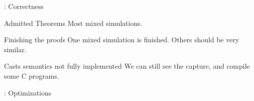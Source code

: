 \begin{frame}{\secname: Correctness}

  \begin{alertblock}{Admitted Theorems}
    Most mixed simulations.
  \end{alertblock}
  \vfill
  \begin{exampleblock}{Finishing the proofs}
    One mixed simulation is finished. Others should be very similar.
  \end{exampleblock}
  \vfill
  \begin{alertblock}{Casts semantics not fully implemented}
    We can still see the capture, and compile some C programs.
  \end{alertblock}
  
\end{frame}

\begin{frame}{\secname: Optimizations}

    \begin{minipage}{0.48\textwidth}
    \begin{center}
      
    \end{center}
  \end{minipage}
  \begin{minipage}{0.48\textwidth}
    
  \end{minipage}
  \vfill
  \begin{minipage}{0.48\textwidth}
    \begin{center}
      
    \end{center}
  \end{minipage}
  \begin{minipage}{0.48\textwidth}
    
  \end{minipage}

\end{frame}
